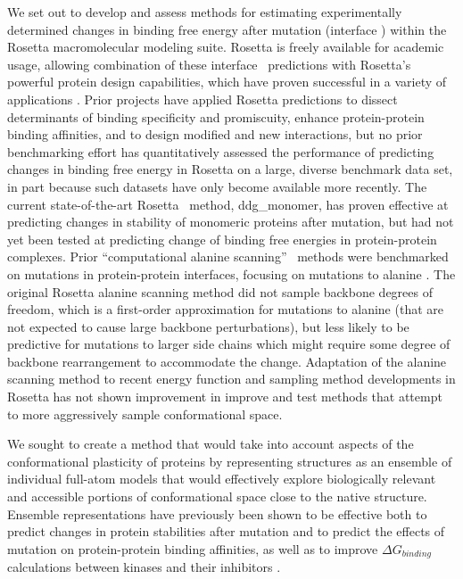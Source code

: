 We set out to develop and assess methods for estimating experimentally determined changes in binding free energy after mutation (interface \ddg) within the Rosetta macromolecular modeling suite. Rosetta is freely available for academic usage, allowing combination of these interface \ddg\ predictions with Rosetta's powerful protein design capabilities, which have proven successful in a variety of applications \cite{mandell_computer-aided_2009,kaufmann_practically_2010}.
Prior projects have applied Rosetta predictions to
dissect determinants of binding specificity and promiscuity\cite{boulanger_convergent_2003,mcfarland_symmetry_2003},
enhance protein-protein binding affinities\cite{sammond_structure-based_2007,song_rational_2006},
and to design modified\cite{kapp_control_2012}
and new interactions\cite{chevalier_design_2002,fleishman_computational_2011,chevalier_massively_2017}, but no prior benchmarking effort has quantitatively assessed the performance of predicting changes in binding free energy in Rosetta on a large, diverse benchmark data set, in part because such datasets have only become available more recently.
The current state-of-the-art Rosetta \ddg\ method,  ddg\_monomer\cite{kellogg_role_2011}, has proven effective at predicting changes in stability of monomeric proteins after mutation, but had not yet been tested at predicting change of binding free energies in protein-protein complexes.
Prior ``computational alanine scanning'' \ddg\ methods were benchmarked on mutations in protein-protein interfaces, focusing on mutations to alanine \cite{kortemme_simple_2002,kortemme_computational_2004,conchuir_web_2015}.
The original Rosetta alanine scanning method\cite{kortemme_simple_2002} did not sample backbone degrees of freedom, which is a first-order approximation for mutations to alanine (that are not expected to cause large backbone perturbations\cite{cunningham_high-resolution_1989}), but less likely to be predictive for mutations to larger side chains which might require some degree of backbone rearrangement to accommodate the change.
Adaptation of the alanine scanning method to recent energy function and sampling method developments in Rosetta has not shown improvement in improve and test methods that attempt to more aggressively sample conformational space.

We sought to create a method that would take into account aspects of the conformational plasticity of proteins by representing structures as an ensemble of individual full-atom models that would effectively explore biologically relevant and accessible portions of conformational space close to the native structure.
Ensemble representations have previously been shown to be effective both to predict changes in protein stabilities after mutation and to predict the effects of mutation on protein-protein binding affinities\cite{benedix_predicting_2009}, as well as to improve $\Delta G_{binding}$ calculations between kinases and their inhibitors \cite{araki_effect_2016}.

